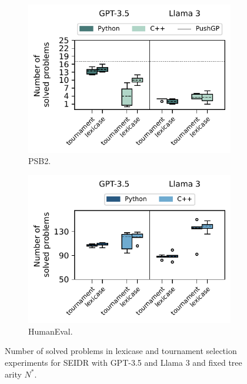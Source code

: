 \begin{figure}
\begin{subfigure}{.45\linewidth}
\centering
\includegraphics[width=\linewidth, trim={0mm 4mm 0mm 0mm}]{images/num_solved_problem_lexicase_psb2_6runs_boxplot_v5.pdf}
  \caption{PSB2.}
  \label{fig:num-solved-lexicase-selection-psb2}
\end{subfigure}
\begin{subfigure}{.45\linewidth}
\centering
\includegraphics[width=\linewidth, trim={0mm 4mm 0mm 0mm}]{images/num_solved_problem_lexicase_humaneval_6runs_boxplot_v5.pdf}
  \caption{HumanEval.}
  \label{fig:num-solved-lexicase-selection-he}
\end{subfigure}
\caption{Number of solved problems in lexicase and tournament selection experiments for SEIDR with GPT-3.5 and Llama 3 and fixed tree arity $N^*$.}
\label{fig:num-solved-lexicase-selection}
\end{figure}


